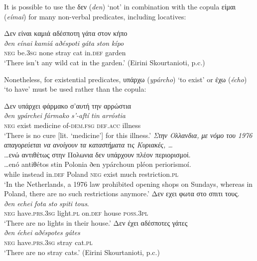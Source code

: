 \documentclass[output=paper,colorlinks,citecolor=brown]{langscibook}
\begin{document}
\begin{paperappendix}
\begin{unindented}
It is possible to use the δεν (\textit{den}) `not' in combination with the
copula είμαι (\textit{eímai}) for many non-verbal predicates, including locatives:
%
\begin{exe}\ex \glll
Δεν είναι καμιά αδέσποτη γάτα στον κήπο \\
\textit{ðen} \textit{eínai} \textit{kamiá} \textit{aðéspoti} \textit{gáta} \textit{ston} \textit{kípo}\\
\textsc{neg} be.\textsc{3sg} none stray cat in.\textsc{def} garden \\
\glt `There isn't any wild cat in the garden.' (Eirini Skourtanioti, p.c.)
    \end{exe}

Nonetheless, for existential predicates, υπάρχω (\textit{ypárcho}) `to
exist' or έχω (\textit{écho}) `to have' must be used rather than the copula:
%
\begin{exe}\ex \glll
Δεν υπάρχει φάρμακο σ'αυτή την αρρώστια \\
\textit{ðen} \textit{ypárchei} \textit{fármako} \textit{s’-aftí}
\textit{tin} \textit{arróstia} \\
\textsc{neg} exist medicine of-\textsc{dem.fsg} \textsc{def.acc} illness\\
    \glt `There is no cure [lit. ‘medicine'] for this illness.'
\parencite[493]{HoltonMackridge2012}
\ex \textit{Στην Ολλανδια, με νόμο του 1976 απαγορεύεται να ανοίγουν τα
καταστήματα τις Κυριακές, \ldots}\\
\glll
\ldots{}ενώ αντιθέτως στην Πολωνια δεν υπάρχουν πλέον περιορισμοί. \\
\ldots{}enó antiθétos stin Polonia ðen ypárchoun pléon periorismoí. \\
while instead in.\textsc{def} Poland \textsc{neg} exist much
restriction.\textsc{pl}\\
    \glt `In the Netherlands, a 1976 law prohibited opening shops on Sundays, whereas in Poland, there are no such restrictions anymore.' \citep[483]{Puigdollers2015}
\ex \glll
Δεν εχει φωτα στο σπιτι τους.  \\
\textit{ðen} \textit{echei} \textit{fota} \textit{sto} \textit{spiti} \textit{tous}.  \\
\textsc{neg} have.\textsc{prs.3sg} light.\textsc{pl} on.\textsc{def} house
\textsc{poss.3pl}\\
    \glt `There are no lights in their house.' \parencite[199]{HoltonMackridge2004}
\ex \glll
Δεν έχει αδέσποτες γάτες\\
\textit{ðen} \textit{échei} \textit{aðéspotes} \textit{gátes}\\
\textsc{neg}  have.\textsc{prs.3sg} stray cat.\textsc{pl} \\
    \glt `There are no stray cats.' (Eirini Skourtanioti, p.c.)
    \end{exe}


\end{unindented}
\end{paperappendix}
\end{document}
